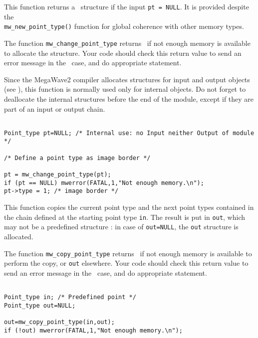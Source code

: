 \Description
This function returns a \pt\ structure if the input \verb+pt = NULL+.
It is provided despite the \\
\verb+mw_new_point_type()+ function for
global coherence with other memory types.

The function \verb+mw_change_point_type+ returns \Null\ if not enough memory is available to allocate the structure. 
Your code should check this return value to send an error message in the \Null\ case, and do appropriate statement.

Since the MegaWave2 compiler allocates structures for input and output 
objects (see \volI), this function is normally used only for internal objects.
Do not forget to deallocate the internal structures before the end
of the module, except if they are part of an input or output chain.

\Next
\Example
\begin{verbatim}

Point_type pt=NULL; /* Internal use: no Input neither Output of module */

/* Define a point type as image border */

pt = mw_change_point_type(pt);
if (pt == NULL) mwerror(FATAL,1,"Not enough memory.\n");
pt->type = 1; /* image border */
\end{verbatim}

\newpage %


\Description
This function copies the current point type and the next point types contained in the chain defined at the starting point type \verb+in+. 
The result is put in \verb+out+, which
may not be a predefined structure : in case of \verb+out=NULL+, the \verb+out+
structure is allocated.

The function \verb+mw_copy_point_type+ returns \Null\ if not enough memory is available to perform
the copy, or \verb+out+ elsewhere.
Your code should check this return value to send an error message in the \Null\ case, and do appropriate statement.

\Next
\Example
\begin{verbatim}

Point_type in; /* Predefined point */
Point_type out=NULL; 

out=mw_copy_point_type(in,out);
if (!out) mwerror(FATAL,1,"Not enough memory.\n");
\end{verbatim}

